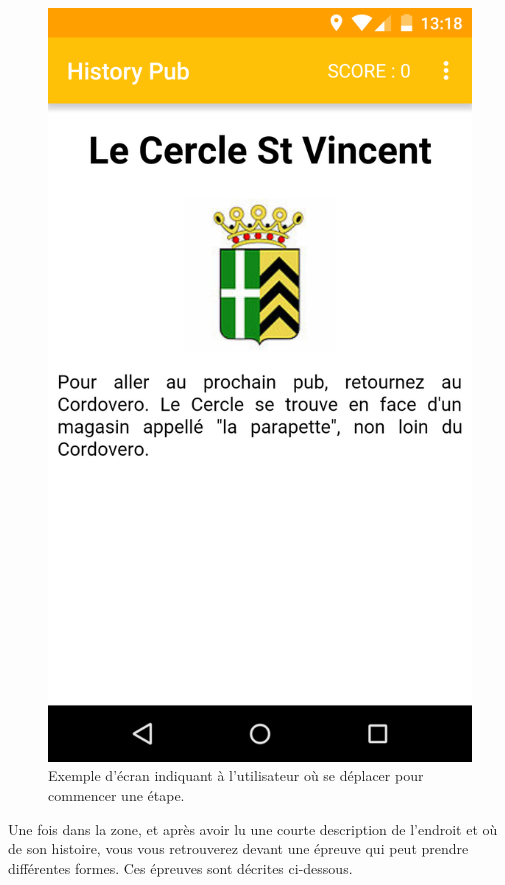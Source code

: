 \documentclass[11pt]{scrreprt}
\begin{document}
    \begin{figure}[H]
        \centering
        \includegraphics[scale=.15]{images/location.png}
        \caption{Exemple d'écran indiquant à l'utilisateur où se déplacer pour commencer une étape.}
    \end{figure}

    Une fois dans la zone, et après avoir lu une courte description de l'endroit et où de son histoire, vous vous retrouverez devant une épreuve qui peut prendre différentes formes. Ces épreuves sont décrites ci-dessous.
\end{document}
